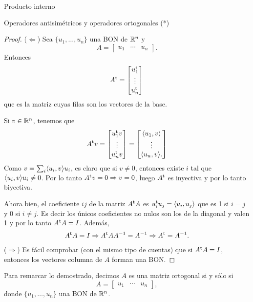 \begin{chapter}{Producto interno}
\begin{section}{Operadores antisim\'etricos y operadores ortogonales (*)}
\begin{proof}
            ($\Leftarrow$)
            Sea $\{u_1,\ldots,u_n\}$ una BON de $\mathbb R^n$ y
            $$ A = \begin{bmatrix}
            u_1 & \cdots & u_n
            \end{bmatrix}. 
            $$
            Entonces
            $$
            A^{{\operatorname{t}}} = \begin{bmatrix}
            u_1^{{\operatorname{t}}} \\ \vdots \\ u_n^{{\operatorname{t}}}
            \end{bmatrix}
            $$
            que es la matriz cuyas filas son los vectores de la base.
            
            
            Si $v \in \mathbb R^n$, tenemos que 
            $$
            A^{{\operatorname{t}}}v = \begin{bmatrix}
            u_1^{{\operatorname{t}}}v \\ \vdots \\ u_n^{{\operatorname{t}}}v 
            \end{bmatrix} = 
            \begin{bmatrix}
            \langle u_1, v \rangle \\ \vdots \\ \langle u_n, v \rangle.
            \end{bmatrix}
            $$
            Como $v = \sum_i \langle u_i, v \rangle u_i$, es claro que si $v \ne 0$, entonces existe $i$ tal que $\langle u_i, v \rangle u_i \ne 0$. Por lo tanto $A^{{\operatorname{t}}}v=0 \Rightarrow v=0$, luego $A^{{\operatorname{t}}}$  es inyectiva y por lo tanto biyectiva.
            
        Ahora bien,  el coeficiente $ij$  de la matriz $A^{{\operatorname{t}}}A$ es $u_i^{{\operatorname{t}}}u_j = \langle u_i,u_j\rangle$ que es 1 si $i=j$ y 0 si $i\ne j$. Es decir los únicos coeficientes no nulos son los de la diagonal y valen 1 y por lo tanto $A^{{\operatorname{t}}}A=I$. Además, $$A^{{\operatorname{t}}}A = I \Rightarrow A^{{\operatorname{t}}}AA^{-1} = A^{-1} \Rightarrow A^{{\operatorname{t}}} = A^{-1}.$$ 
        
        ($\Rightarrow$) Es fácil comprobar (con el mismo tipo de cuentas) que si $A^{{\operatorname{t}}}A=I$, entonces los vectores columna de $A$ forman una BON.
        
        \end{proof}
        
        Para remarcar lo demostrado, decimos  $A$ es una matriz ortogonal si y sólo si
        $$ A = \begin{bmatrix}
        u_1 & \cdots & u_n
        \end{bmatrix}, 
        $$
        donde  $\{u_1,\ldots,u_n\}$ una BON de $\mathbb R^n$.
        

\end{section}
\end{chapter}
